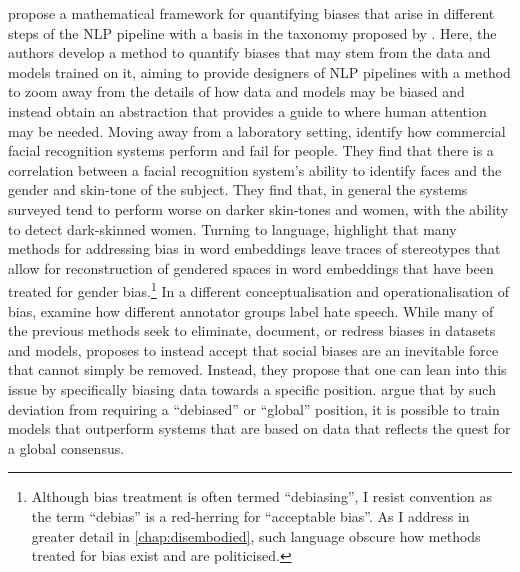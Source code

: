 \citet{Shah:2020} propose a mathematical framework for quantifying biases that arise in different steps of the NLP pipeline with a basis in the taxonomy proposed by \citet{Hovy-Spruit:2016}. Here, the authors develop a method to quantify biases that may stem from the data and models trained on it, aiming to provide designers of NLP pipelines with a method to zoom away from the details of how data and models may be biased and instead obtain an abstraction that provides a guide to where human attention may be needed.
Moving away from a laboratory setting, \citet{Buolamwini:2018} identify how commercial facial recognition systems perform and fail for people. They find that there is a correlation between a facial recognition system's ability to identify faces and the gender and skin-tone of the subject. They find that, in general the systems surveyed tend to perform worse on darker skin-tones and women, with the ability to detect dark-skinned women.
Turning to language, \citet{Gonen:2019} highlight that many methods for addressing bias in word embeddings leave traces of stereotypes that allow for reconstruction of gendered spaces in word embeddings that have been treated for gender bias.\footnote{Although bias treatment is often termed ``debiasing'', I resist convention as the term ``debias'' is a red-herring for ``acceptable bias''. As I address in greater detail in \cref{chap:disembodied}, such language obscure how methods treated for bias exist and are politicised.}
In a different conceptualisation and operationalisation of bias, \citet{Waseem:2016} examine how different annotator groups label hate speech. While many of the previous methods seek to eliminate, document, or redress biases in datasets and models, \citet{Waseem:2016} proposes to instead accept that social biases are an inevitable force that cannot simply be removed. Instead, they propose that one can lean into this issue by specifically biasing data towards a specific position. \citet{Waseem:2016} argue that by such deviation from requiring a ``debiased'' or ``global'' position, it is possible to train models that outperform systems that are based on data that reflects the quest for a global consensus.

